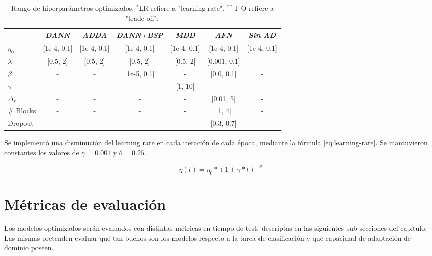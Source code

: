 \begin{table}[H]
    \centering
    \begin{tabular}{l|cccccc}
        \toprule
                   & {\it DANN}  & {\it ADDA}  & {\it DANN+BSP} & {\it MDD}   & {\it AFN}    & {\it Sin AD} \\
        \midrule
        $\eta_0$   & [1e-4, 0.1] & [1e-4, 0.1] & [1e-4, 0.1]    & [1e-4, 0.1] & [1e-4, 0.1]  & [1e-4, 0.1]  \\
        $\lambda$  & [0.5, 2]    & [0.5, 2]    & [0.5, 2]       & [0.5, 2]    & [0.001, 0.1] & -            \\
        $\beta$    & -           & -           & [1e-5, 0.1]    & -           & [0.0, 0.1]   & -            \\
        $\gamma$   & -           & -           & -              & [1, 10]     & -            & -            \\
        $\Delta_r$ & -           & -           & -              & -           & [0.01, 5]    & -            \\
        \# Blocks  & -           & -           & -              & -           & [1, 4]       & -            \\
        Dropout    & -           & -           & -              & -           & [0.3, 0.7]   & -            \\
        \bottomrule
    \end{tabular}
    \caption{Rango de hiperpar\'ametros optimizados. $^{*}$LR refiere a "learning rate". $^{**}$T-O refiere a "trade-off".}
    \label{tab:rangos-hiperparametros}
\end{table}

Se implement\'o una disminuci\'on del learning rate en cada iteraci\'on de cada \'epoca, mediante la f\'ormula
\ref{eq:learning-rate}. Se mantuvieron constantes los valores de $\gamma=0.001$ y $\theta = 0.25$.

\begin{equation}
    \eta(t) = \eta_0 * (1 + \gamma * t)^{-\theta}
    \label{eq:learning-rate}
\end{equation}

\section{M\'etricas de evaluaci\'on}

Los modelos optimizados ser\'an evaluados con distintas m\'etricas en tiempo de test, descriptas en las siguientes
sub-secciones del cap\'itulo. Las mismas pretenden evaluar qu\'e tan buenos son los modelos respecto a la tarea de
clasificaci\'on y qu\'e capacidad de adaptaci\'on de dominio poseen.

